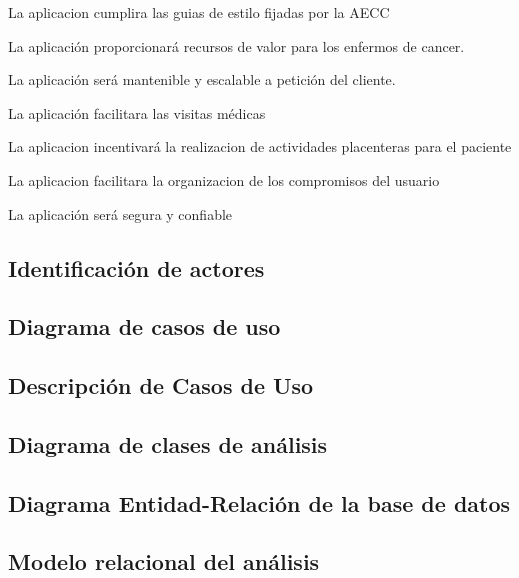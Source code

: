 \documentclass[../pfc.tex]{subfiles}
\begin{document}
		La aplicacion cumplira las guias de estilo fijadas por la AECC
		
		La aplicación proporcionará recursos de valor para los enfermos de cancer.
		
		La aplicación será mantenible y escalable a petición del cliente.
		
		La aplicación facilitara las visitas médicas
		
		La aplicacion incentivará la realizacion de actividades placenteras para el paciente
		
		La aplicacion facilitara la organizacion de los compromisos del usuario
		
		La aplicación será segura y confiable
		
	

	\subsection{Identificación de actores}
		
	\subsection{Diagrama de casos de uso }
		
	\subsection{Descripción de Casos de Uso}
		
	\subsection{Diagrama de clases de análisis}
		
	\subsection{Diagrama Entidad-Relación de la base de datos}
		
	\subsection{Modelo relacional del análisis}
	
\end{document}
